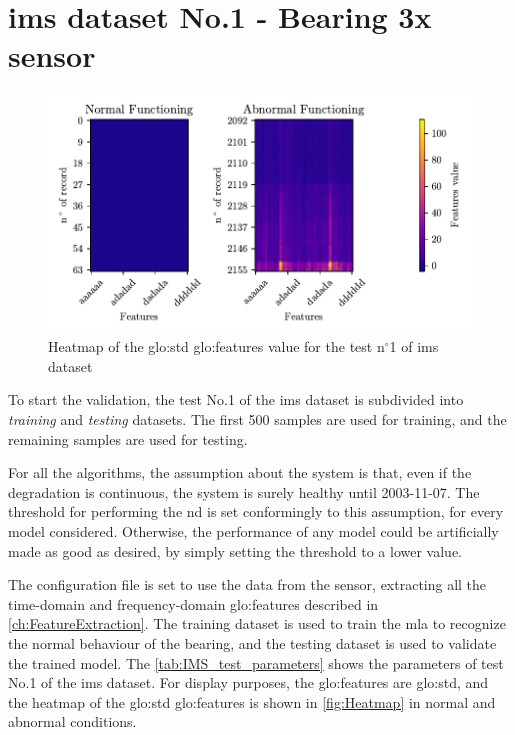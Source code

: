 \section{\gls{ims} dataset No.1 - Bearing 3x sensor}
\label{sec:ValidationOnRealWorldData}
\begin{figure}
    \centering
    \includegraphics{images/IMS/Heatmap.pdf}
    \caption{Heatmap of the \gls{glo:std} \gls{glo:feature}s value for the test $\text{n}^\circ$1 of \gls{ims} dataset}
    \label{fig:Heatmap}
\end{figure}


To start the validation, the test No.1 of the \gls{ims} dataset is subdivided into \emph{training} and \emph{testing} datasets. The first 500 samples are used for training, and the remaining samples are used for testing. 

For all the algorithms, the assumption about the system is that, even if the degradation is continuous, the system is surely healthy until 2003-11-07. The threshold for performing the \gls{nd} is set conformingly to this assumption, for every model considered. Otherwise, the performance of any model could be artificially made as good as desired, by simply setting the threshold to a lower value.

The configuration file is set to use the data from the  sensor, extracting all the time-domain and frequency-domain \gls{glo:feature}s described in \autoref{ch:FeatureExtraction}. The training dataset is used to train the \gls{mla} to recognize the normal behaviour of the bearing, and the testing dataset is used to validate the trained model. The \autoref{tab:IMS_test_parameters} shows the parameters of test No.1 of the \gls{ims} dataset. For display purposes, the \gls{glo:feature}s are \gls{glo:std}, and the heatmap of the \gls{glo:std} \gls{glo:feature}s is shown in \autoref{fig:Heatmap} in normal and abnormal conditions.

